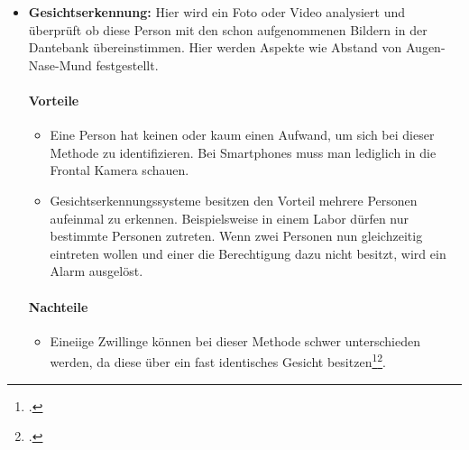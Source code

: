\begin{itemize}
	\paragraph{Nachteile}
	\begin{itemize}
		\item In dem Fall, dass sich eine Person auf dem Finger verletzt, kann es dazu führen, dass der Fingerabdruck sich verändert. Aus diesem Grund kann sich die Person möglicherweise nicht mehr identifizieren\footcite{fingerabdruck}.
	\end{itemize}
	\item \textbf{Gesichtserkennung:} Hier wird ein Foto oder Video analysiert und überprüft ob diese Person mit den schon aufgenommenen Bildern in der Dantebank übereinstimmen. Hier werden Aspekte wie Abstand von Augen-Nase-Mund festgestellt.
	\paragraph{Vorteile}
	\begin{itemize}
		\item Eine Person hat keinen oder kaum einen Aufwand, um sich bei dieser Methode zu identifizieren. Bei Smartphones muss man lediglich in die Frontal Kamera schauen.
		\item Gesichtserkennungssysteme besitzen den Vorteil mehrere Personen aufeinmal zu erkennen. Beispielsweise in einem Labor dürfen nur bestimmte Personen zutreten. Wenn zwei Personen nun gleichzeitig eintreten wollen und einer die Berechtigung dazu nicht besitzt, wird ein Alarm ausgelöst.
	\end{itemize}
	\paragraph{Nachteile}
	\begin{itemize}
		\item Eineiige Zwillinge können bei dieser Methode schwer unterschieden werden, da diese über ein fast identisches Gesicht besitzen\footcite{gesichtserkennung-1}\footcite{gesichtserkennung-2}.
	\end{itemize}
\end{itemize}


